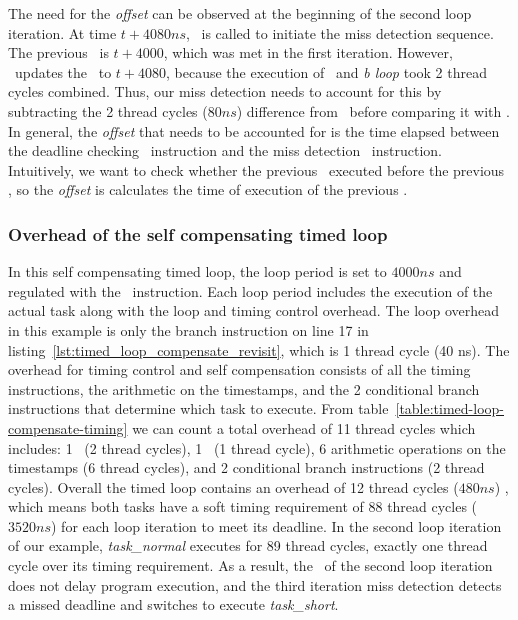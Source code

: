 The need for the \emph{offset} can be observed at the beginning of the second loop iteration.
At time $t+4080ns$, \gettime\ is called to initiate the miss detection sequence.
The previous \deadlinet\ is $t+4000$, which was met in the first iteration.  
However, \gettime\ updates the \currentt\ to $t+4080$, because the execution of \delayuntil\ and \emph{b loop} took 2 thread cycles combined. 
Thus, our miss detection needs to account for this by subtracting the 2 thread cycles ($80ns$) difference from \currentt\ before comparing it with \deadlinet.
In general, the \emph{offset} that needs to be accounted for is the time elapsed between the deadline checking \delayuntil\ instruction and the miss detection \gettime\ instruction.
Intuitively, we want to check whether the previous \delayuntil\ executed before the previous \deadlinet, so the \emph{offset} is calculates the time of execution of the previous \delayuntil.  

\subsubsection{Overhead of the self compensating timed loop}
In this self compensating timed loop, the loop period is set to $4000ns$ and regulated with the \delayuntil\ instruction.
Each loop period includes the execution of the actual task along with the loop and timing control overhead.
The loop overhead in this example is only the branch instruction on line 17 in listing~\ref{lst:timed_loop_compensate_revisit}, which is 1 thread cycle (40 ns).
The overhead for timing control and self compensation consists of all the timing instructions, the arithmetic on the timestamps, and the 2 conditional branch instructions that determine which task to execute.
From table~\ref{table:timed-loop-compensate-timing} we can count a total overhead of 11 thread cycles which includes: 1 \gettime\ (2 thread cycles), 1 \delayuntil\ (1 thread cycle), 6 arithmetic operations on the timestamps (6 thread cycles), and 2 conditional branch instructions (2 thread cycles).
Overall the timed loop contains an overhead of 12 thread cycles ($480ns$) , which means both tasks have a soft timing requirement of 88 thread cycles ($3520ns$) for each loop iteration to meet its deadline.  
In the second loop iteration of our example, \emph{task\_normal} executes for 89 thread cycles, exactly one thread cycle over its timing requirement. 
As a result, the \delayuntil\ of the second loop iteration does not delay program execution, and the third iteration miss detection detects a missed deadline and switches to execute \emph{task\_short}. 

